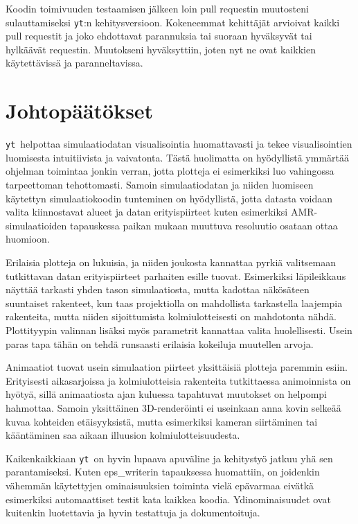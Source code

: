 \documentclass[12pt,a4paper]{article}
\newcommand{\yt}{\texttt{yt}}
\begin{document}
Koodin toimivuuden testaamisen jälkeen loin pull requestin muutosteni sulauttamiseksi \yt :n kehitysversioon. Kokeneemmat kehittäjät arvioivat kaikki pull requestit ja joko ehdottavat parannuksia tai suoraan hyväksyvät tai hylkäävät requestin. Muutokseni hyväksyttiin, joten nyt ne ovat kaikkien käytettävissä  ja paranneltavissa. 

\section{Johtopäätökset}
\yt\ helpottaa simulaatiodatan visualisointia huomattavasti ja tekee visualisointien luomisesta intuitiivista ja vaivatonta. Tästä huolimatta on hyödyllistä ymmärtää ohjelman toimintaa jonkin verran, jotta plotteja ei esimerkiksi luo vahingossa tarpeettoman tehottomasti. Samoin simulaatiodatan ja niiden luomiseen käytettyn simulaatiokoodin tunteminen on hyödyllistä, jotta datasta voidaan valita kiinnostavat alueet ja datan erityispiirteet kuten esimerkiksi AMR-simulaatioiden tapauskessa paikan mukaan muuttuva resoluutio osataan ottaa huomioon.

Erilaisia plotteja on lukuisia, ja niiden joukosta kannattaa pyrkiä valitsemaan tutkittavan datan erityispiirteet parhaiten esille tuovat. Esimerkiksi läpileikkaus näyttää tarkasti yhden tason simulaatiosta, mutta kadottaa näkösäteen suuntaiset rakenteet, kun taas projektiolla on mahdollista tarkastella laajempia rakenteita, mutta niiden sijoittumista kolmiulotteisesti on mahdotonta nähdä. Plottityypin valinnan lisäksi myös parametrit kannattaa valita huolellisesti. Usein paras tapa tähän on tehdä runsaasti erilaisia kokeiluja muutellen arvoja.

Animaatiot tuovat usein simulaation piirteet yksittäisiä plotteja paremmin esiin. Erityisesti aikasarjoissa ja kolmiulotteisia rakenteita tutkittaessa animoinnista on hyötyä, sillä animaatiosta ajan kuluessa tapahtuvat muutokset on helpompi hahmottaa. Samoin yksittäinen 3D-renderöinti ei useinkaan anna kovin selkeää kuvaa kohteiden etäisyyksistä, mutta esimerkiksi kameran siirtäminen tai kääntäminen saa aikaan illuusion kolmiulotteisuudesta.

Kaikenkaikkiaan \yt\ on hyvin lupaava apuväline ja kehitystyö jatkuu yhä sen parantamiseksi. Kuten {eps\_writer}in tapauksessa huomattiin, on joidenkin vähemmän käytettyjen ominaisuuksien toiminta vielä epävarmaa eivätkä esimerkiksi automaattiset testit kata kaikkea koodia. Ydinominaisuudet ovat kuitenkin luotettavia ja hyvin testattuja ja dokumentoituja. 
\end{document}
